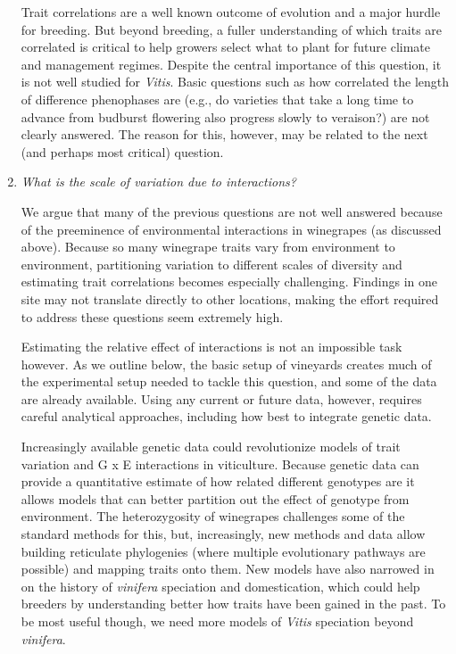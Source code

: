 \documentclass[11pt]{article}
\begin{document}
\begin{enumerate}
Trait correlations are a well known outcome of evolution and a major hurdle for breeding. But beyond breeding, a fuller understanding of which traits are correlated is critical to help growers select what to plant for future climate and management regimes. Despite the central importance of this question, it is not well studied for \emph{Vitis}. Basic questions such as how correlated the length of difference phenophases are (e.g., do varieties that take a long time to advance from budburst flowering also progress slowly to veraison?) are not clearly answered. The reason for this, however, may be related to the next (and perhaps most critical) question.

\item \emph{What is the scale of variation due to interactions?} %

We argue that many of the previous questions are not well answered because of the preeminence of environmental interactions in winegrapes (as discussed above). Because so many winegrape traits vary from environment to environment, partitioning variation to different scales of diversity and estimating trait correlations becomes especially challenging. Findings in one site may not translate directly to other locations, making the effort required to address these questions seem extremely high. 

Estimating the relative effect of interactions is not an impossible task however. As we outline below, the basic setup of vineyards creates much of the experimental setup needed to tackle this question, and some of the data are already available. Using any current or future data, however, requires careful analytical approaches, including how best to integrate genetic data. 

Increasingly available genetic data could revolutionize models of trait variation and G x E interactions in viticulture. Because genetic data can provide a quantitative estimate of how related different genotypes are it allows models that can better partition out the effect of genotype from environment. The heterozygosity of winegrapes challenges some of the standard methods for this, but, increasingly, new methods and data allow building reticulate phylogenies (where multiple evolutionary pathways are possible) and mapping traits onto them. New models have also narrowed in on the history of \emph{vinifera} speciation and domestication, which could help breeders by understanding better how traits have been gained in the past. To be most useful though, we need more models of \emph{Vitis} speciation beyond \emph{vinifera}. %


\end{enumerate}
\end{document}
